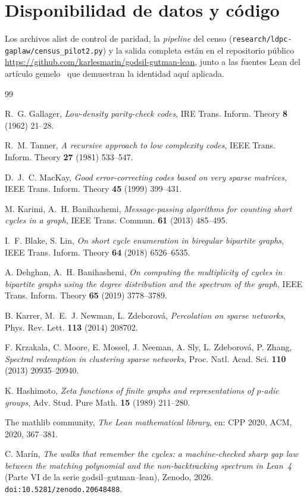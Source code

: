 \documentclass[11pt]{article}
\newcommand{\lean}[1]{\texttt{#1}}
\begin{document}
\section*{Disponibilidad de datos y código}
Los archivos alist de control de paridad, la \emph{pipeline} del censo
(\lean{research/\allowbreak ldpc-gaplaw/\allowbreak census\_pilot2.py}) y la salida completa están en el repositorio
público \url{https://github.com/karlesmarin/godsil-gutman-lean}, junto a las fuentes Lean del
artículo gemelo~\cite{MarinGapWindow2026} que demuestran la identidad aquí aplicada.

\begin{thebibliography}{99}\small

 R.~G. Gallager,
\emph{Low-density parity-check codes}, IRE Trans. Inform. Theory \textbf{8} (1962) 21--28.

 R.~M. Tanner,
\emph{A recursive approach to low complexity codes}, IEEE Trans. Inform. Theory \textbf{27}
(1981) 533--547.

 D.~J.~C. MacKay,
\emph{Good error-correcting codes based on very sparse matrices}, IEEE Trans. Inform. Theory
\textbf{45} (1999) 399--431.

 M. Karimi, A.~H. Banihashemi,
\emph{Message-passing algorithms for counting short cycles in a graph},
IEEE Trans. Commun. \textbf{61} (2013) 485--495.

 I.~F. Blake, S. Lin,
\emph{On short cycle enumeration in biregular bipartite graphs},
IEEE Trans. Inform. Theory \textbf{64} (2018) 6526--6535.

 A. Dehghan, A.~H. Banihashemi,
\emph{On computing the multiplicity of cycles in bipartite graphs using the degree
distribution and the spectrum of the graph}, IEEE Trans. Inform. Theory \textbf{65} (2019)
3778--3789.

 B. Karrer, M.~E.~J. Newman, L. Zdeborov\'a,
\emph{Percolation on sparse networks}, Phys. Rev. Lett. \textbf{113} (2014) 208702.

 F. Krzakala, C. Moore, E. Mossel, J. Neeman, A. Sly, L. Zdeborov\'a,
P. Zhang, \emph{Spectral redemption in clustering sparse networks},
Proc. Natl. Acad. Sci. \textbf{110} (2013) 20935--20940.

 K. Hashimoto,
\emph{Zeta functions of finite graphs and representations of $p$-adic groups},
Adv. Stud. Pure Math. \textbf{15} (1989) 211--280.

 The mathlib community,
\emph{The Lean mathematical library}, en: CPP 2020, ACM, 2020, 367--381.

 C. Mar\'in,
\emph{The walks that remember the cycles: a machine-checked sharp gap law between the
matching polynomial and the non-backtracking spectrum in Lean~4} (Parte VI de la serie
godsil--gutman--lean), Zenodo, 2026. \texttt{doi:10.5281/zenodo.20648488}.

\end{thebibliography}
\end{document}
